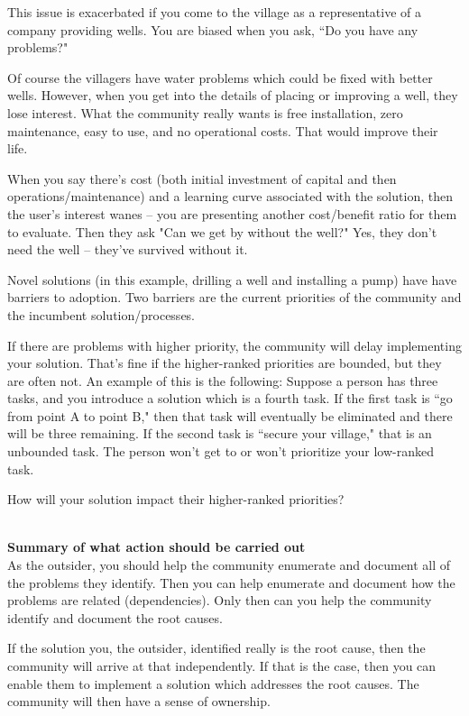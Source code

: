 This issue is exacerbated if you come to the village as a representative of a company providing wells. You are biased when you ask, ``Do you have any problems?"

Of course the villagers have water problems which could be fixed with better wells. However, when you get into the details of placing or improving a well, they lose interest. What the community really wants is free installation, zero maintenance, easy to use, and no operational costs. That would improve their life.

When you say there's cost (both initial investment of capital and then operations/maintenance) and a learning curve associated with the solution, then the user's interest wanes -- you are presenting another cost/benefit ratio for them to evaluate. Then they ask "Can we get by without the well?" Yes, they don't need the well -- they've survived without it.

Novel solutions (in this example, drilling a well and installing a pump) have have barriers to adoption. Two barriers are the current priorities of the community and the incumbent solution/processes.

If there are problems with higher priority, the community will delay implementing your solution. That's fine if the higher-ranked priorities are bounded, but they are often not. An example of this is the following:
Suppose a person has three tasks, and you introduce a solution which is a fourth task.
If the first task is ``go from point A to point B," then that task will eventually be eliminated and there will be three remaining.
If the second task is ``secure your village," that is an unbounded task. The person won't get to or won't prioritize your low-ranked task.

How will your solution impact their higher-ranked priorities?

\ \\

\textbf{Summary of what action should be carried out} \\

As the outsider, you should help the community enumerate and document all of the problems they identify. Then you can help enumerate and document how the problems are related (dependencies). Only then can you help the community identify and document the root causes.

If the solution you, the outsider, identified really is the root cause, then the community will arrive at that independently. If that is the case, then you can enable them to implement a solution which addresses the root causes. The community will then have a sense of ownership.
